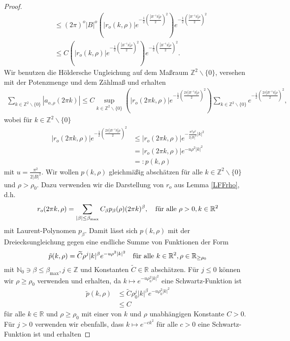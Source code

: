 \documentclass[12pt,a4paper]{scrartcl}
\numberwithin{equation}{section}
\newcommand{\R}{\mathbb{R}} %
\newcommand{\Z}{\mathbb{Z}} %
\newcommand{\N}{\mathbb{N}} %
\newcommand{\fa}{\text{\quad für alle }}
\begin{document}
\begin{proof}
\begin{align*}
&\leq (2\pi)^o |B|^o \left(|r_o(k,\rho)|e^{-\frac{1}{2}\left(\frac{|B^{-1}k|\rho}{2}\right)^2}\right)e^{-\frac{1}{2}\left(\frac{|B^{-1}k|\rho}{2}\right)^2} \\
&\leq  C\left(|r_o(k,\rho)|e^{-\frac{1}{2}\left(\frac{|B^{-1}k|\rho}{2}\right)^2}\right)e^{-\frac{1}{2}\left(\frac{|B^{-1}k|\rho}{2}\right)^2}.
\end{align*} Wir benutzen die Höldersche Ungleichung auf dem Maßraum $\Z^2 \backslash \{0 \}$, versehen mit der Potenzmenge und dem Zählmaß und erhalten 
\begin{align*}
\sum_{k \in \Z^2 \backslash \{0\} }|a_{o,\rho}(2 \pi k)| 
\leq C \sup_{k \in \Z^2\backslash \{0\} }
\left(|r_o(2\pi k,\rho)|e^{-\frac{1}{2}\left(\frac{2 \pi |B^{-1}k|\rho}{2}\right)^2} \right)
\sum_{k \in \Z^2 \backslash \{0\} }e^{-\frac{1}{2}\left(\frac{2 \pi|B^{-1}k|\rho}{2}\right)^2},
\end{align*}
wobei für $k \in \Z^2 \backslash \{0\}$
\begin{align*}
|r_o(2\pi k,\rho)|e^{-\frac{1}{2}\left(\frac{2 \pi |B^{-1}k|\rho}{2}\right)^2}
&\leq |r_o(2\pi k,\rho)|e^{-\frac{\pi^2 \rho^2}{2|B|^2} |k|^2} \\
&= |r_o(2\pi k,\rho)|e^{-u\rho^2|k|^2} \\
&=: p(k,\rho)
\end{align*}
mit $u=\frac{\pi^2}{2|B|^2}$. Wir wollen $p(k,\rho)$ gleichmäßig abschätzen für alle $k \in \Z^2 \backslash \{0\}$ und $\rho>\rho_0$. Dazu verwenden wir die Darstellung von $r_o$ aus Lemma \ref{LFFrho}, d.h.
\[
r_o(2\pi k,\rho) = \sum_{|\beta| \leq \beta_{\max}} C_{\beta} p_{\beta}(\rho)  (2 \pi k)^{\beta}, \fa \rho>0, k \in \R^2
\]
mit Laurent-Polynomen $p_{\beta}$.
Damit lässt sich $p(k,\rho)$ mit der Dreiecksungleichung gegen eine endliche Summe von Funktionen der Form
\[
\tilde p(k,\rho) =\widetilde C \rho^j |k|^\beta e^{-u \rho^2 |k|^2} \fa k \in \R^2, \rho \in \R_{\geq \rho_0}
\]
mit $\N_0 \ni \beta\leq \beta_{\max},j \in \Z$ und Konstanten $\widetilde C \in \R$ abschätzen. 
Für $j\leq 0$ können wir $\rho \geq \rho_0$ verwenden und erhalten, da $k \mapsto e^{-u \rho_0^2 |k|^2}$ eine Schwartz-Funktion ist
\begin{align*}
\tilde p(k,\rho) &\leq \widetilde C \rho_0^j |k|^\beta e^{-u \rho_0^2 |k|^2}  \\
& \leq C
\end{align*}
für alle $k \in \R$ und $\rho\geq \rho_0$ mit einer von $k$ und $\rho$ unabhängigen Konstante $C>0$.
Für $j>0$ verwenden wir ebenfalls, dass $k \mapsto e^{-c k^2}$ für alle $c>0$ eine Schwartz-Funktion ist und erhalten

\end{proof}
\end{document}
